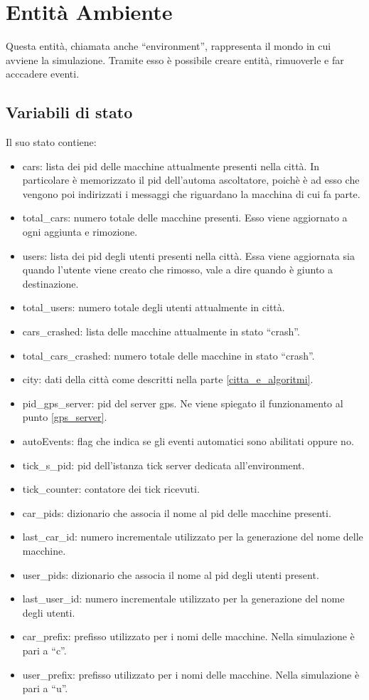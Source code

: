 \newpage

\section{Entità Ambiente}
Questa entità, chiamata anche ``environment'', rappresenta il mondo in cui avviene la simulazione. Tramite esso è possibile creare entità, rimuoverle e far acccadere eventi.

\subsection{Variabili di stato}
Il suo stato contiene:
\begin{itemize}
	\item cars: lista dei pid delle macchine attualmente presenti nella città. In particolare è memorizzato il pid dell'automa ascoltatore, poichè è ad esso che vengono poi indirizzati i messaggi che riguardano la macchina di cui fa parte.
	\item total\_cars: numero totale delle macchine presenti. Esso viene aggiornato a ogni aggiunta e rimozione.
	\item users: lista dei pid degli utenti presenti nella città. Essa viene aggiornata sia quando l'utente viene creato che rimosso, vale a dire quando è giunto a destinazione.
	\item total\_users: numero totale degli utenti attualmente in città.
	\item cars\_crashed: lista delle macchine attualmente in stato ``crash''.
	\item total\_cars\_crashed: numero totale delle macchine in stato ``crash''.
	\item city: dati della città come descritti nella parte \ref{citta_e_algoritmi}.
	\item pid\_gps\_server: pid del server gps. Ne viene spiegato il funzionamento al punto \ref{gps_server}.
	\item autoEvents: flag che indica se gli eventi automatici sono abilitati oppure no.
	\item tick\_s\_pid: pid dell'istanza tick server dedicata all'environment.
	\item tick\_counter: contatore dei tick ricevuti.
	\item car\_pids: dizionario che associa il nome al pid delle macchine presenti.
	\item last\_car\_id: numero incrementale utilizzato per la generazione del nome delle macchine.
	\item user\_pids: dizionario che associa il nome al pid degli utenti present.
	\item last\_user\_id: numero incrementale utilizzato per la generazione del nome degli utenti.
	\item car\_prefix: prefisso utilizzato per i nomi delle macchine. Nella simulazione è pari a ``c''.
	\item user\_prefix: prefisso utilizzato per i nomi delle macchine. Nella simulazione è pari a ``u''.
\end{itemize}

